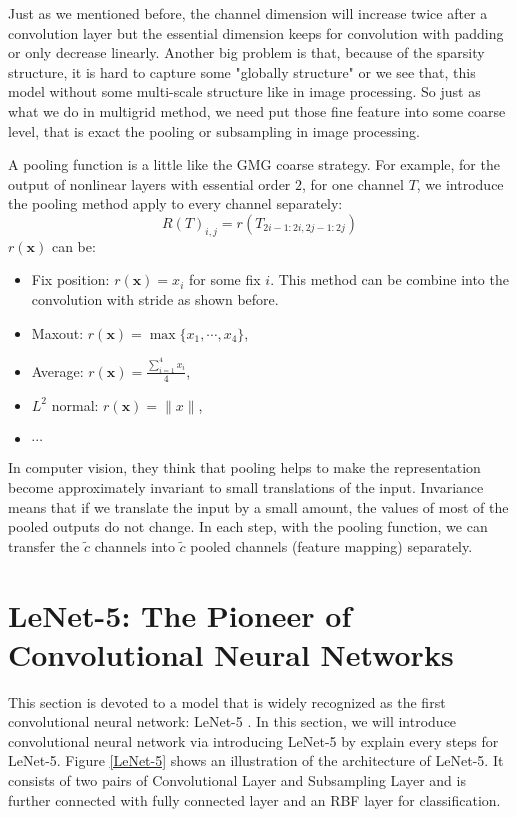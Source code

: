 Just as we mentioned before, the channel dimension will increase twice after a convolution layer but the essential dimension keeps for convolution with padding or only decrease linearly. Another big problem is that, because of the sparsity structure, it is hard to capture some "globally structure" or we see that, this model without some multi-scale structure like in image processing.
 So just as what we do in multigrid method, we need put those fine feature into some coarse level, that is exact the pooling or subsampling in image processing. 

A pooling function is a little like the GMG coarse strategy.   For example, for the output of nonlinear layers with essential order $2$, for one channel $T$, we introduce the pooling method apply to every channel separately: 
\begin{equation}
R(T)_{i,j} = r(T_{2i-1:2i,2j-1:2j})
\end{equation}
$r(\bm{x})$ can be:
\begin{itemize}
\item Fix position: $r(\bm{x}) = x_i$ for some fix $i$. This method can be combine into the convolution with stride as shown before.
\item Maxout: $r(\bm{x}) = \max \{x_1, \cdots, x_4\}$,
\item Average: $r(\bm{x}) = \frac{\sum_{i=1}^4 x_i}{4}$,
\item $L^2$ normal: $r(\bm{x}) = \|x\|$,
\item $\cdots$
\end{itemize}

In computer vision, they think that pooling helps to make the representation become approximately invariant to small translations of the input. Invariance means that if we translate the input by a small amount, the values of most of the pooled outputs do not change.
In each step, with the pooling function, we can transfer the $\tilde c$ channels into $\tilde c$ pooled channels (feature mapping)  separately. 


\section{LeNet-5: The Pioneer of Convolutional Neural Networks}
This section is devoted to a model that is widely recognized as the first convolutional neural network: LeNet-5 \cite{Lecun1998Gradient}. In this section, we will introduce convolutional neural network via introducing LeNet-5 by explain every steps for LeNet-5.
Figure \ref{LeNet-5} shows an illustration of the architecture of LeNet-5. It consists of two pairs of Convolutional Layer and Subsampling Layer and is further connected with fully connected layer and an RBF layer for classification.


